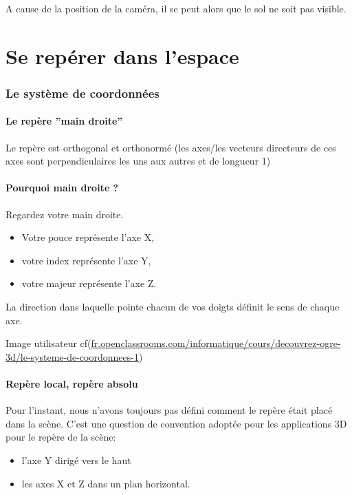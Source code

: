 \documentclass[10pt,a4paper]{report}
\begin{document}
A cause de la position de la cam\'era, il se peut alors que le sol ne soit pas visible.







\part{Se rep\'erer dans l'espace}


\section{Le syst\`eme de coordonn\'ees}


\subsection{Le rep\`ere ''main droite''}

Le rep\`ere est orthogonal et orthonorm\'e (les axes/les vecteurs directeurs de ces axes sont perpendiculaires les uns aux autres et de longueur 1)



\subsection{Pourquoi main droite ?}

Regardez votre main droite.
\begin{itemize} 
\item Votre pouce repr\'esente l'axe X, 
\item votre index repr\'esente l'axe Y,
\item votre majeur repr\'esente l'axe Z. 
\end{itemize}

La direction dans laquelle pointe chacun de vos doigts d\'efinit le sens de chaque axe.

Image utilisateur cf(\url{fr.openclassrooms.com/informatique/cours/decouvrez-ogre-3d/le-systeme-de-coordonnees-1})





\subsection{Rep\`ere local, rep\`ere absolu}

Pour l'instant, nous n'avons toujours pas d\'efini comment le rep\`ere \'etait plac\'e dans la sc\`ene. C'est une question de convention adopt\'ee pour les applications 3D	pour le rep\`ere de la sc\`ene:
\begin{itemize}
\item l'axe Y dirig\'e vers le haut 
\item les axes X et Z dans un plan horizontal.
\end{itemize}
\end{document}
